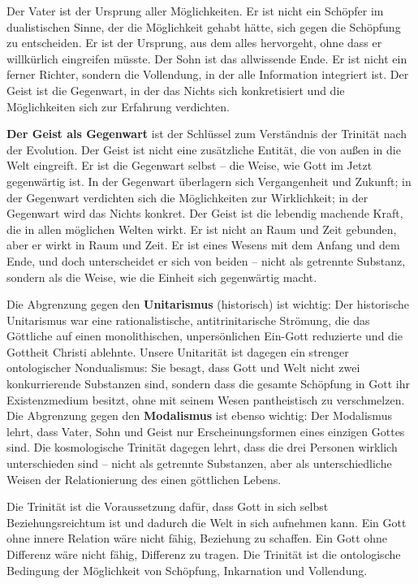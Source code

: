 \documentclass[
  ngerman,
]{article}
\begin{document}
Der Vater ist der Ursprung aller Möglichkeiten. Er ist nicht ein
Schöpfer im dualistischen Sinne, der die Möglichkeit gehabt hätte, sich
gegen die Schöpfung zu entscheiden. Er ist der Ursprung, aus dem alles
hervorgeht, ohne dass er willkürlich eingreifen müsste. Der Sohn ist das
allwissende Ende. Er ist nicht ein ferner Richter, sondern die
Vollendung, in der alle Information integriert ist. Der Geist ist die
Gegenwart, in der das Nichts sich konkretisiert und die Möglichkeiten
sich zur Erfahrung verdichten.

\textbf{Der Geist als Gegenwart} ist der Schlüssel zum Verständnis der
Trinität nach der Evolution. Der Geist ist nicht eine zusätzliche
Entität, die von außen in die Welt eingreift. Er ist die Gegenwart
selbst -- die Weise, wie Gott im Jetzt gegenwärtig ist. In der Gegenwart
überlagern sich Vergangenheit und Zukunft; in der Gegenwart verdichten
sich die Möglichkeiten zur Wirklichkeit; in der Gegenwart wird das
Nichts konkret. Der Geist ist die lebendig machende Kraft, die in allen
möglichen Welten wirkt. Er ist nicht an Raum und Zeit gebunden, aber er
wirkt in Raum und Zeit. Er ist eines Wesens mit dem Anfang und dem Ende,
und doch unterscheidet er sich von beiden -- nicht als getrennte
Substanz, sondern als die Weise, wie die Einheit sich gegenwärtig macht.

Die Abgrenzung gegen den \textbf{Unitarismus} (historisch) ist wichtig:
Der historische Unitarismus war eine rationalistische, antitrinitarische
Strömung, die das Göttliche auf einen monolithischen, unpersönlichen
Ein-Gott reduzierte und die Gottheit Christi ablehnte. Unsere Unitarität
ist dagegen ein strenger ontologischer Nondualismus: Sie besagt, dass
Gott und Welt nicht zwei konkurrierende Substanzen sind, sondern dass
die gesamte Schöpfung in Gott ihr Existenzmedium besitzt, ohne mit
seinem Wesen pantheistisch zu verschmelzen. Die Abgrenzung gegen den
\textbf{Modalismus} ist ebenso wichtig: Der Modalismus lehrt, dass
Vater, Sohn und Geist nur Erscheinungsformen eines einzigen Gottes sind.
Die kosmologische Trinität dagegen lehrt, dass die drei Personen
wirklich unterschieden sind -- nicht als getrennte Substanzen, aber als
unterschiedliche Weisen der Relationierung des einen göttlichen Lebens.

Die Trinität ist die Voraussetzung dafür, dass Gott in sich selbst
Beziehungsreichtum ist und dadurch die Welt in sich aufnehmen kann. Ein
Gott ohne innere Relation wäre nicht fähig, Beziehung zu schaffen. Ein
Gott ohne Differenz wäre nicht fähig, Differenz zu tragen. Die Trinität
ist die ontologische Bedingung der Möglichkeit von Schöpfung,
Inkarnation und Vollendung.
\end{document}
